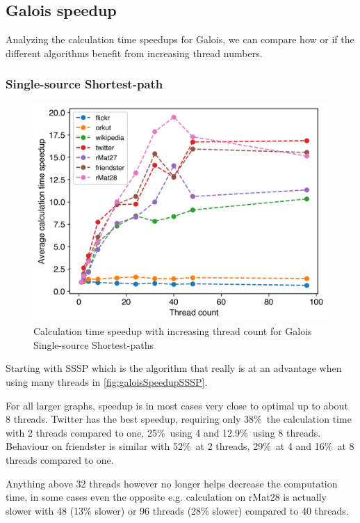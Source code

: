 



\subsection{Galois speedup}
\label{sec:galois_speedup}
Analyzing the calculation time speedups for Galois, we can compare how or if the different algorithms benefit from increasing thread numbers.

\subsubsection{Single-source Shortest-path}
\begin{figure}
	\includegraphics[width=\linewidth]{../../plots/singleNodeSSSPGaloisThreads.png}
	\caption{Calculation time speedup with increasing thread count for Galois Single-source Shortest-paths}
	\label{fig:galoisSpeedupSSSP}
\end{figure}
Starting with SSSP which is the algorithm that really is at an advantage when using many threads in \autoref{fig:galoisSpeedupSSSP}.

For all larger graphs, speedup is in most cases very close to optimal up to about 8 threads. 
Twitter has the best speedup, requiring only 38\%\ the calculation time with 2 threads compared to one, 25\%\ using 4 and 12.9\%\ using 8 threads.
Behaviour on friendster is similar with 52\%\ at 2 threads, 29\%\ at 4 and 16\%\ at 8 threads compared to one.

Anything above 32 threads however no longer helps decrease the computation time, in some cases even the opposite e.g. calculation on rMat28 is actually slower with 48 (13\% slower) or 96 threads (28\% slower) compared to 40 threads.

